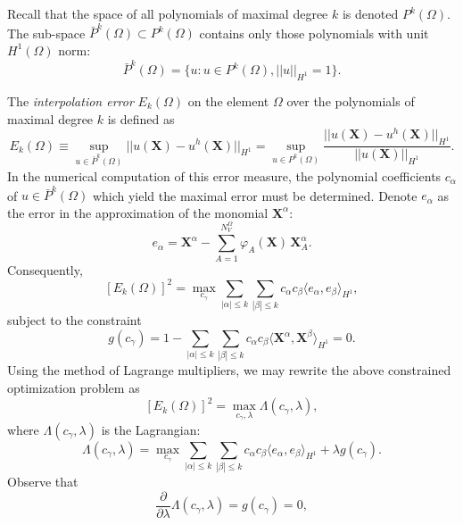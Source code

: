 Recall that the space of all polynomials of maximal degree $k$ is denoted $P^k (\Omega)$. The sub-space $\bar{P}^k (\Omega) \subset P^k (\Omega)$ contains only those polynomials with unit $H^1 (\Omega)$ norm:
\begin{equation}
        \bar{P}^k (\Omega) = \{ u : u \in P^k (\Omega), ||u||_{H^1} = 1 \}.
\end{equation}

The \textit{interpolation error} $E_k (\Omega)$ on the element $\Omega$ over the polynomials of maximal degree $k$ is defined as
\begin{equation}
        E_k (\Omega) \equiv \sup_{u \in \bar{P}^k (\Omega)} || u(\bm{X}) - u^h(\bm{X}) ||_{H^1} = \sup_{u \in P^k (\Omega)} \frac{|| u(\bm{X}) - u^h(\bm{X}) ||_{H^1}}{|| u(\bm{X}) ||_{H^1}}.
\end{equation}
In the numerical computation of this error measure, the polynomial coefficients $c_\alpha$ of $u \in \bar{P}^k (\Omega)$ which yield the maximal error must be determined. Denote $e_\alpha$ as the error in the approximation of the monomial $\bm{X}^\alpha$:
\begin{equation}
        e_\alpha = \bm{X}^{\alpha} - \sum_{A = 1}^{N^{\Omega}_V} \varphi_A (\bm{X}) \, \bm{X}_A^{\alpha}.
\end{equation}
Consequently,
\begin{equation}
        \left[ E_k (\Omega) \right]^2 = \max_{c_\gamma} \sum_{|\alpha| \leq k} \sum_{|\beta| \leq k} c_{\alpha} c_{\beta} \langle e_\alpha, e_\beta \rangle_{H^1},
\end{equation}
subject to the constraint
\begin{equation}
        g(c_\gamma) = 1 - \sum_{|\alpha| \leq k} \sum_{|\beta| \leq k} c_{\alpha} c_{\beta} \langle \bm{X}^\alpha, \bm{X}^\beta \rangle_{H^1} = 0.
\end{equation}
Using the method of Lagrange multipliers, we may rewrite the above constrained optimization problem as
\begin{equation}
        \left[ E_k (\Omega) \right]^2 = \max_{c_\gamma, \lambda} \Lambda (c_\gamma,\lambda),
\end{equation}
where $\Lambda (c_\gamma,\lambda)$ is the Lagrangian:
\begin{equation}
        \Lambda (c_\gamma, \lambda) = \max_{c_\gamma} \sum_{|\alpha| \leq  k} \sum_{|\beta| \leq k} c_{\alpha} c_{\beta} \langle e_\alpha, e_\beta \rangle_{H^1} + \lambda g(c_\gamma).
\end{equation}
Observe that
\begin{equation}
        \frac{\partial}{\partial \lambda} \Lambda (c_\gamma, \lambda) = g(c_\gamma) = 0,
\end{equation}
